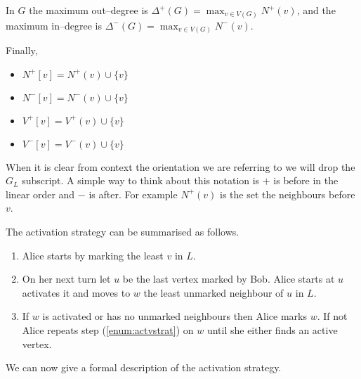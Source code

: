 In $G$ the maximum out--degree is $\Delta^+(G)=\max_{v\in V(G)}N^+(v)$, and 
the maximum in--degree is $\Delta^-(G)=\max_{v\in V(G)}N^-(v)$. 

Finally,
\begin{itemize}  
    \item $N^+[v]=N^+(v)\cup\{v\}$
    \item $N^-[v]=N^-(v)\cup\{v\}$
    \item $V^+[v]=V^+(v)\cup\{v\}$
    \item $V^-[v]=V^-(v)\cup\{v\}$
\end{itemize}
When it is clear from context the orientation we are referring to we will drop the $G_L$ subscript.  A simple way to think about this notation is $+$ is before in the linear order and $-$ is after. For example $N^+(v)$ is the set the neighbours before $v$.

The activation strategy can be summarised as follows. 
\begin{enumerate}
    \item Alice starts by marking the least $v$ in $L$.
    \item On her next turn let $u$ be the last vertex marked by Bob. Alice starts at $u$ activates it and moves to $w$ the least unmarked neighbour of $u$ in $L$. \label{enum:actvstrat}
    \item If $w$ is activated or has no unmarked neighbours then Alice marks $w$. If not Alice repeats step (\ref{enum:actvstrat}) on $w$ until she either finds an active vertex.
\end{enumerate}


 We can now give a formal description of the activation strategy.

